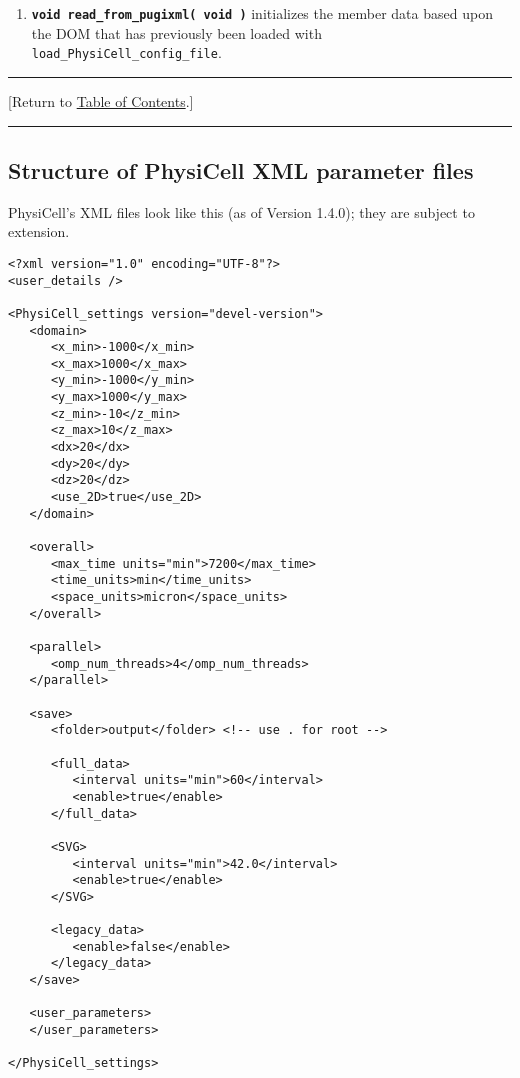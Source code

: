 \documentclass[12pt]{article}
\renewcommand{\v}{\verb}
\newcommand{\smallcode}[1]{\textbf{\texttt{#1}}}
\newcommand{\TOClink}{\begin{center}\hrule\vskip-10pt\phantom{.}\hfill[Return to \hyperlink{TOC}{Table of Contents}.]\hfill\phantom{.}\vskip3pt\hrule\end{center}}
\begin{document}
\begin{enumerate}
\item 
\smallcode{void read\_from\_pugixml( void )} initializes the member data 
based upon the DOM that has previously been loaded with 
\v|load_PhysiCell_config_file|. 

\end{enumerate}

\TOClink 


\subsection{Structure of PhysiCell XML parameter files}
\label{sec:XML_PhysiCell_structure}
PhysiCell's XML files look like this (as of Version 1.4.0); they 
are subject to extension. 

\begin{verbatim}
<?xml version="1.0" encoding="UTF-8"?>
<user_details />

<PhysiCell_settings version="devel-version">
   <domain>
      <x_min>-1000</x_min>
      <x_max>1000</x_max>
      <y_min>-1000</y_min>
      <y_max>1000</y_max>
      <z_min>-10</z_min>
      <z_max>10</z_max>
      <dx>20</dx>
      <dy>20</dy>
      <dz>20</dz>
      <use_2D>true</use_2D>
   </domain>
   
   <overall>
      <max_time units="min">7200</max_time>  
      <time_units>min</time_units>
      <space_units>micron</space_units>
   </overall>
   
   <parallel>
      <omp_num_threads>4</omp_num_threads>
   </parallel> 
   
   <save>
      <folder>output</folder> <!-- use . for root --> 

      <full_data>
         <interval units="min">60</interval>
         <enable>true</enable>
      </full_data>
      
      <SVG>
         <interval units="min">42.0</interval>
         <enable>true</enable>
      </SVG>
      
      <legacy_data>
         <enable>false</enable>
      </legacy_data>
   </save>
   
   <user_parameters>
   </user_parameters>

</PhysiCell_settings>
\end{verbatim}
\end{document}
